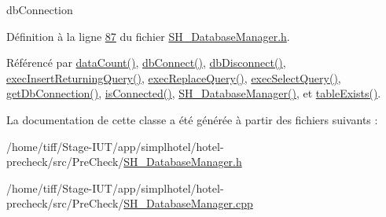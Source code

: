 db\-Connection 



Définition à la ligne \hyperlink{SH__DatabaseManager_8h_source_l00087}{87} du fichier \hyperlink{SH__DatabaseManager_8h_source}{S\-H\-\_\-\-Database\-Manager.\-h}.



Référencé par \hyperlink{classSH__DatabaseManager_ad3e372d89b60b43e3f3bae649be6d7fb}{data\-Count()}, \hyperlink{classSH__DatabaseManager_aeb077fe5437f435c0cbe8d77d96dd846}{db\-Connect()}, \hyperlink{classSH__DatabaseManager_a3716cf1a5f521cc49584dbcb2fab28bf}{db\-Disconnect()}, \hyperlink{classSH__DatabaseManager_a1c0399265021ed79a1c07a0e01c7a5dc}{exec\-Insert\-Returning\-Query()}, \hyperlink{classSH__DatabaseManager_aa42b90708c2fdb89588cb67d2e4f8ad7}{exec\-Replace\-Query()}, \hyperlink{classSH__DatabaseManager_ab8f9850cb68444ab9a4e613b36a3b044}{exec\-Select\-Query()}, \hyperlink{classSH__DatabaseManager_adf7c1e261fd3feed3dea6614d8a80d5f}{get\-Db\-Connection()}, \hyperlink{classSH__DatabaseManager_ab125b77320dca843740fc9928fbbe16f}{is\-Connected()}, \hyperlink{classSH__DatabaseManager_a7b5d0e372c153eb59cdab98588994904}{S\-H\-\_\-\-Database\-Manager()}, et \hyperlink{classSH__DatabaseManager_af83a53b26cee86b3194cac14928115ed}{table\-Exists()}.



La documentation de cette classe a été générée à partir des fichiers suivants \-:\begin{DoxyCompactItemize}
\item 
/home/tiff/\-Stage-\/\-I\-U\-T/app/simplhotel/hotel-\/precheck/src/\-Pre\-Check/\hyperlink{SH__DatabaseManager_8h}{S\-H\-\_\-\-Database\-Manager.\-h}\item 
/home/tiff/\-Stage-\/\-I\-U\-T/app/simplhotel/hotel-\/precheck/src/\-Pre\-Check/\hyperlink{SH__DatabaseManager_8cpp}{S\-H\-\_\-\-Database\-Manager.\-cpp}\end{DoxyCompactItemize}
